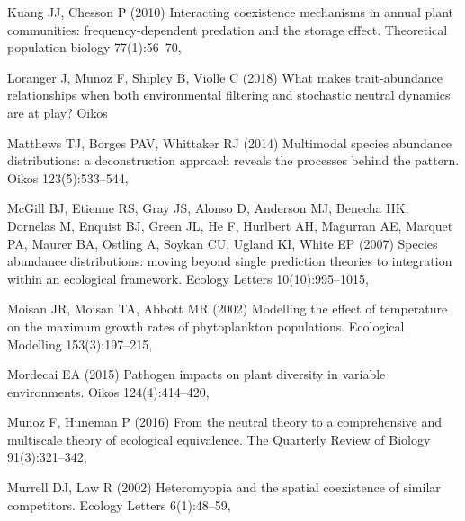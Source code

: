 \documentclass[smallcondensed,referee]{svjour3}       %
\begin{document}
\begin{thebibliography}{56}
Kuang JJ, Chesson P (2010) Interacting coexistence mechanisms in annual plant
  communities: frequency-dependent predation and the storage effect.
  Theoretical population biology 77(1):56--70, 

Loranger J, Munoz F, Shipley B, Violle C (2018) What makes trait-abundance
  relationships when both environmental filtering and stochastic neutral
  dynamics are at play? Oikos 

Matthews TJ, Borges PAV, Whittaker RJ (2014) Multimodal species abundance
  distributions: a deconstruction approach reveals the processes behind the
  pattern. Oikos 123(5):533--544, 

McGill BJ, Etienne RS, Gray JS, Alonso D, Anderson MJ, Benecha HK, Dornelas M,
  Enquist BJ, Green JL, He F, Hurlbert AH, Magurran AE, Marquet PA, Maurer BA,
  Ostling A, Soykan CU, Ugland KI, White EP (2007) Species abundance
  distributions: moving beyond single prediction theories to integration within
  an ecological framework. Ecology Letters 10(10):995--1015,

Moisan JR, Moisan TA, Abbott MR (2002) Modelling the effect of temperature on
  the maximum growth rates of phytoplankton populations. Ecological Modelling
  153(3):197--215, 

Mordecai EA (2015) Pathogen impacts on plant diversity in variable
  environments. Oikos 124(4):414--420, 

Munoz F, Huneman P (2016) From the neutral theory to a comprehensive and
  multiscale theory of ecological equivalence. The Quarterly Review of Biology
  91(3):321--342, 

Murrell DJ, Law R (2002) Heteromyopia and the spatial coexistence of similar
  competitors. Ecology Letters 6(1):48--59,


\end{thebibliography}
\end{document}
